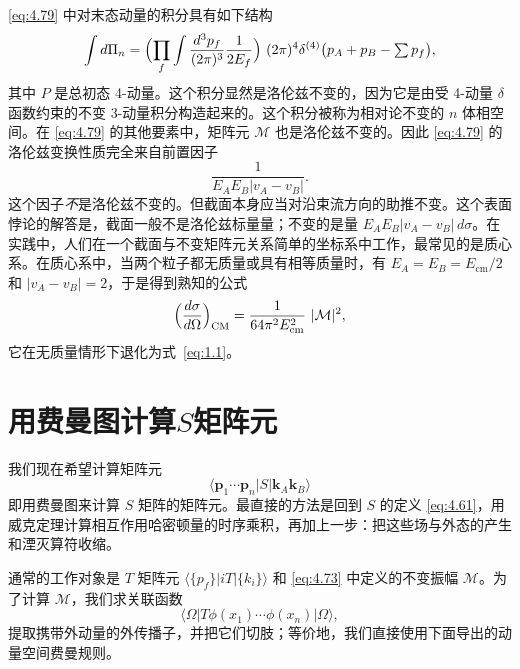 \eqref{eq:4.79} 中对末态动量的积分具有如下结构
\begin{equation}
  \int d\Pi_n = \Bigl( \prod_f \int \frac{d^3p_f}{(2\pi)^3}\frac{1}{2E_f}
    \Bigr)\ (2\pi)^4\delta^{(4)}\bigl( p_A+p_B-\textstyle\sum p_f \bigr),
  \label{eq:4.80}
\end{equation}
其中 $P$ 是总初态 4-动量。这个积分显然是洛伦兹不变的，因为它是由受 4-动量 $\delta$ 函数约束的不变 3-动量积分构造起来的。这个积分被称为相对论不变的 $n$ 体相空间。在 \eqref{eq:4.79} 的其他要素中，矩阵元 $\mathcal{M}$ 也是洛伦兹不变的。因此 \eqref{eq:4.79} 的洛伦兹变换性质完全来自前置因子
\begin{equation}
  \frac{1}{E_AE_B|v_A-v_B|} .
  \label{eq:4.81}
\end{equation}
这个因子\emph{不}是洛伦兹不变的。但截面本身应当对沿束流方向的助推不变。这个表面悖论的解答是，截面一般不是洛伦兹标量量；不变的是量 $E_AE_B|v_A-v_B|\, d\sigma$。在实践中，人们在一个截面与不变矩阵元关系简单的坐标系中工作，最常见的是质心系。在质心系中，当两个粒子都无质量或具有相等质量时，有 $E_A = E_B = E_{\mathrm{cm}}/2$ 和 $|v_A-v_B| = 2$，于是得到熟知的公式
\begin{equation}
  \Bigl( \frac{d\sigma}{d\Omega} \Bigr)_{\mathrm{CM}}
    = \frac{1}{64\pi^2E_{\mathrm{cm}}^2}\ |\mathcal{M}|^2 ,
  \label{eq:4.82}
\end{equation}
它在无质量情形下退化为式~\eqref{eq:1.1}。

\section{用费曼图计算$S$矩阵元}

我们现在希望计算矩阵元
\begin{equation}
  \langle \mathbf{p}_1\cdots\mathbf{p}_n|S|\mathbf{k}_A\mathbf{k}_B\rangle
  \label{eq:4.83}
\end{equation}
即用费曼图来计算 $S$ 矩阵的矩阵元。最直接的方法是回到 $S$ 的定义 \eqref{eq:4.61}，用威克定理计算相互作用哈密顿量的时序乘积，再加上一步：把这些场与外态的产生和湮灭算符收缩。

通常的工作对象是 $T$ 矩阵元 $\langle\{p_f\}|iT|\{k_i\}\rangle$ 和 \eqref{eq:4.73} 中定义的不变振幅 $\mathcal{M}$。为了计算 $\mathcal{M}$，我们求关联函数
\begin{equation}
  \langle \Omega|T\phi(x_1)\cdots\phi(x_n)|\Omega\rangle ,
\end{equation}
提取携带外动量的外传播子，并把它们切肢；等价地，我们直接使用下面导出的动量空间费曼规则。

